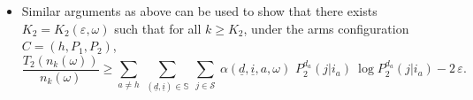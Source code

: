\begin{itemize}
{%
%
}
	\item Similar arguments as above can be used to show that there exists $K_2=K_2(\varepsilon, \omega)$ such that for all $k\geq K_2$, under the arms configuration $C=(h, P_1, P_2)$,
		\begin{equation}
			\frac{T_2(n_{k}(\omega))}{n_k(\omega)} \geq  \sum\limits_{a\neq h}~\sum\limits_{(\underline{d}, \underline{i})\in \mathbb{S}}~\sum\limits_{j\in\mathcal{S}}~ \alpha(\underline{d}, \underline{i}, a, \omega)\,\, P_2^{d_a}(j|i_a) ~\log P_2^{d_a}(j|i_a) -2\, \varepsilon.
			\label{eq:liminf_T_2(n)/n_final}
		\end{equation}
	

\end{itemize}
